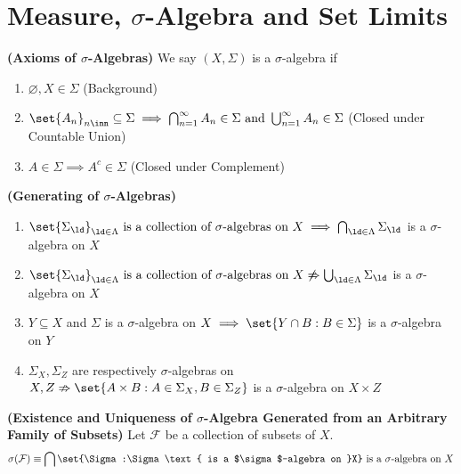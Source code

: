 \documentclass{report}
\begin{document}
\section{Measure, $\sigma$-Algebra and Set Limits}
\begin{axiom}
\label{0.7.1}
\textbf{(Axioms of $\sigma$-Algebras)} 
We say $(X,\Sigma)$ is a $\sigma$-algebra if 
\begin{enumerate}[label=(\alph*)]
  \item $\varnothing,X\in \Sigma $ (Background)
  \item $\set{A_n}_{n\inn}\subseteq \Sigma \implies \bigcap_{n=1}^\infty A_n\in \Sigma \text{ and }\bigcup_{n=1}^\infty A_n \in \Sigma $ (Closed under Countable Union)
  \item $A \in \Sigma \implies A^c \in \Sigma $ (Closed under Complement)
\end{enumerate}
\end{axiom}
\begin{theorem}
\label{0.7.2}
\textbf{(Generating of $\sigma$-Algebras)} 
\begin{enumerate}[label=(\alph*)]
  \item $\set{\Sigma_\ld}_{\ld  \in \Lambda }\text{ is a collection of $\sigma$-algebras on }X \implies \bigcap_{\ld  \in \Lambda }\Sigma_\ld $ is a $\sigma $-algebra on $X$ 
  \item $\set{\Sigma_\ld}_{\ld  \in \Lambda }\text{ is a collection of $\sigma$-algebras on }X \not \nRightarrow \bigcup _{\ld  \in \Lambda }\Sigma_\ld $ is a $\sigma $-algebra on $X$ 
  \item $Y\subseteq X$ and $\Sigma$ is a $\sigma$-algebra on $X\implies \set{Y\cap B:B \in \Sigma}$ is a $\sigma$-algebra on $Y$ 
  \item $\Sigma_X,\Sigma_Z$ are respectively $\sigma$-algebras on $X,Z\nRightarrow\set{A\times B:A \in \Sigma_X, B\in \Sigma_Z}$ is a $\sigma$-algebra on $X\times Z$
\end{enumerate}
\end{theorem}
\begin{corollary}
\label{0.7.3}
\textbf{(Existence and Uniqueness of $\sigma$-Algebra Generated from an Arbitrary Family of Subsets)} Let  $\mathcal{F}$ be a collection of subsets of $X$.  
\begin{align*}
\sigma(\mathcal{F})\equiv \bigcap \set{\Sigma:\Sigma\text{ is a $\sigma$-algebra on }X}\text{ is a $\sigma$-algebra on $X$}
\end{align*}
\end{corollary}
\end{document}
